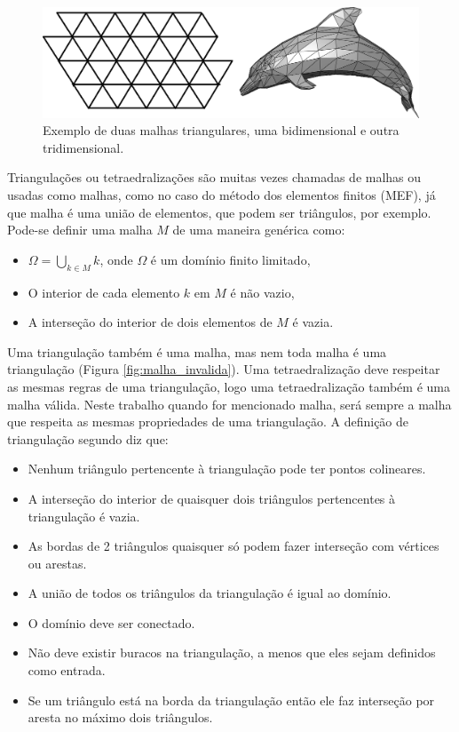  \begin{figure}[htbp]
 	\centering
 	\includegraphics[width=1.0\textwidth]{fig/malha_bi_tri.png}
 	\caption{Exemplo de duas malhas triangulares, uma bidimensional e outra tridimensional.} 
 	\label{fig:malhas_triangulares}
 \end{figure}

Triangulações ou tetraedralizações são muitas vezes chamadas de malhas ou usadas como malhas, como no caso do método dos elementos finitos (MEF), já que malha é uma união de elementos, que podem ser triângulos, por exemplo. Pode-se definir uma malha $M$ de uma maneira genérica como:

\begin{itemize}
 \item $\varOmega = \bigcup\limits_{k \in M} k $, onde $\varOmega$ é um domínio finito limitado,
 \item O interior de cada elemento $k$ em $M$ é não vazio,
 \item A interseção do interior de dois elementos de $M$ é vazia.
\end{itemize}


Uma triangulação também é uma malha, mas nem toda malha é uma triangulação (Figura \ref{fig:malha_invalida}). Uma tetraedralização deve respeitar as mesmas regras de uma triangulação, logo uma tetraedralização também é uma malha válida. Neste trabalho quando for mencionado malha, será sempre a malha que respeita as mesmas propriedades de uma triangulação. A definição de triangulação segundo \cite{bib:Triangulations_applications} diz que:

\begin{itemize}
  \item Nenhum triângulo pertencente à triangulação pode ter pontos colineares.
  \item A interseção do interior de quaisquer dois triângulos pertencentes à triangulação é vazia.
  \item As bordas de 2 triângulos quaisquer só podem fazer interseção com vértices ou arestas.
  \item A união de todos os triângulos da triangulação é igual ao domínio.  
  \item O domínio deve ser conectado.
  \item Não deve existir buracos na triangulação, a menos que eles sejam definidos como entrada.
  \item Se um triângulo está na borda da triangulação então ele faz interseção por aresta no máximo dois triângulos.
\end{itemize}



